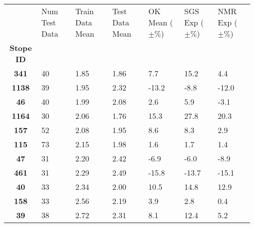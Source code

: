 \begin{tabular}{c*{6}{p{1.5cm}}}
\toprule
{} & Num Test Data & Train Data Mean & Test Data Mean & OK Mean ($\pm\%$) & SGS Exp ($\pm\%$) & NMR Exp ($\pm\%$) \\
\textbf{Stope ID} &               &                 &                &                   &                   &                   \\
\midrule
\textbf{341     } &            40 &            1.85 &           1.86 &               7.7 &              15.2 &               4.4 \\
\textbf{1138    } &            39 &            1.95 &           2.32 &             -13.2 &              -8.8 &             -12.0 \\
\textbf{46      } &            40 &            1.99 &           2.08 &               2.6 &               5.9 &              -3.1 \\
\textbf{1164    } &            30 &            2.06 &           1.76 &              15.3 &              27.8 &              20.3 \\
\textbf{157     } &            52 &            2.08 &           1.95 &               8.6 &               8.3 &               2.9 \\
\textbf{115     } &            73 &            2.15 &           1.98 &               1.6 &               1.7 &               1.4 \\
\textbf{47      } &            31 &            2.20 &           2.42 &              -6.9 &              -6.0 &              -8.9 \\
\textbf{461     } &            31 &            2.29 &           2.49 &             -15.8 &             -13.7 &             -15.1 \\
\textbf{40      } &            33 &            2.34 &           2.00 &              10.5 &              14.8 &              12.9 \\
\textbf{158     } &            33 &            2.56 &           2.19 &               3.9 &               2.8 &               0.4 \\
\textbf{39      } &            38 &            2.72 &           2.31 &               8.1 &              12.4 &               5.2 \\
\bottomrule
\end{tabular}

